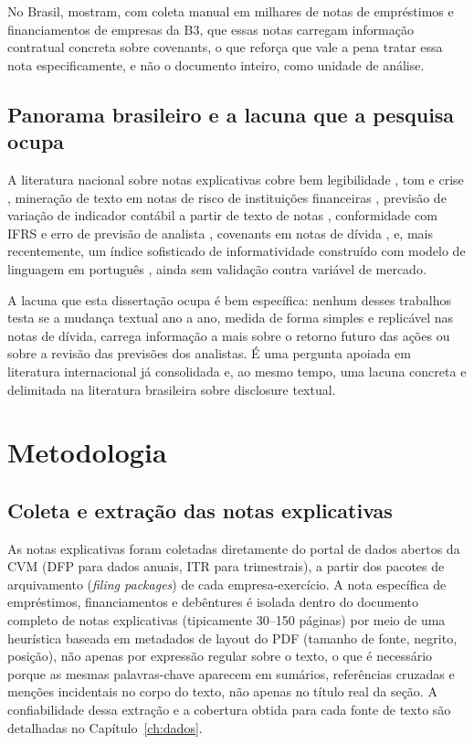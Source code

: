 \documentclass[a4paper,12pt]{report}
\begin{document}
No Brasil,  mostram, com coleta manual em milhares de notas de empréstimos e financiamentos de empresas da B3, que essas notas carregam informação contratual concreta sobre covenants, o que reforça que vale a pena tratar essa nota especificamente, e não o documento inteiro, como unidade de análise.

\section{Panorama brasileiro e a lacuna que a pesquisa ocupa}

A literatura nacional sobre notas explicativas cobre bem legibilidade \cite{borges,silva2019}, tom e crise \cite{muniz2025}, mineração de texto em notas de risco de instituições financeiras \cite{marcolin}, previsão de variação de indicador contábil a partir de texto de notas \cite{maeda2017}, conformidade com IFRS e erro de previsão de analista \cite{santos2018}, covenants em notas de dívida \cite{schiozer2021}, e, mais recentemente, um índice sofisticado de informatividade construído com modelo de linguagem em português \cite{costaneto2025}, ainda sem validação contra variável de mercado.

A lacuna que esta dissertação ocupa é bem específica: nenhum desses trabalhos testa se a mudança textual ano a ano, medida de forma simples e replicável nas notas de dívida, carrega informação a mais sobre o retorno futuro das ações ou sobre a revisão das previsões dos analistas. É uma pergunta apoiada em literatura internacional já consolidada \cite{cohen2020,amelzadeh2016} e, ao mesmo tempo, uma lacuna concreta e delimitada na literatura brasileira sobre disclosure textual.

\chapter{Metodologia}
\label{ch:metodologia}

\section{Coleta e extração das notas explicativas}
\label{sec:coleta}

As notas explicativas foram coletadas diretamente do portal de dados abertos da CVM (DFP para dados anuais, ITR para trimestrais), a partir dos pacotes de arquivamento (\textit{filing packages}) de cada empresa-exercício. A nota específica de empréstimos, financiamentos e debêntures é isolada dentro do documento completo de notas explicativas (tipicamente 30--150 páginas) por meio de uma heurística baseada em metadados de layout do PDF (tamanho de fonte, negrito, posição), não apenas por expressão regular sobre o texto, o que é necessário porque as mesmas palavras-chave aparecem em sumários, referências cruzadas e menções incidentais no corpo do texto, não apenas no título real da seção. A confiabilidade dessa extração e a cobertura obtida para cada fonte de texto são detalhadas no Capítulo~\ref{ch:dados}.
\end{document}
